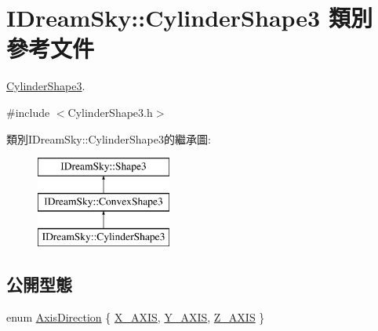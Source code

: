 \hypertarget{class_i_dream_sky_1_1_cylinder_shape3}{}\section{I\+Dream\+Sky\+:\+:Cylinder\+Shape3 類別 參考文件}
\label{class_i_dream_sky_1_1_cylinder_shape3}


\hyperlink{class_i_dream_sky_1_1_cylinder_shape3}{Cylinder\+Shape3}.  




{\ttfamily \#include $<$Cylinder\+Shape3.\+h$>$}

類別\+I\+Dream\+Sky\+:\+:Cylinder\+Shape3的繼承圖\+:\begin{figure}[H]
\begin{center}
\leavevmode
\includegraphics[height=3.000000cm]{class_i_dream_sky_1_1_cylinder_shape3}
\end{center}
\end{figure}
\subsection*{公開型態}
\begin{DoxyCompactItemize}
\item 
enum \hyperlink{class_i_dream_sky_1_1_cylinder_shape3_ad077fbb709c7e56e615ce7349be523e4}{Axis\+Direction} \{ \hyperlink{class_i_dream_sky_1_1_cylinder_shape3_ad077fbb709c7e56e615ce7349be523e4a951c488eff3ac127c35745ef2bf420bb}{X\+\_\+\+A\+X\+IS}, 
\hyperlink{class_i_dream_sky_1_1_cylinder_shape3_ad077fbb709c7e56e615ce7349be523e4af467d35181826740bd9052cd12e0e0ac}{Y\+\_\+\+A\+X\+IS}, 
\hyperlink{class_i_dream_sky_1_1_cylinder_shape3_ad077fbb709c7e56e615ce7349be523e4acee80b4c4fc6d3e5419957085517e27a}{Z\+\_\+\+A\+X\+IS}
 \}
\end{DoxyCompactItemize}
